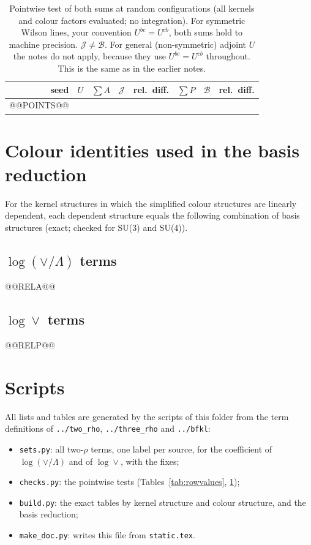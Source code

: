 \documentclass[10pt]{article}
\numberwithin{equation}{section}
\newcommand{\J}{\mathcal J}
\newcommand{\B}{\mathcal B}
\begin{document}
\begin{table}[H]
\centering\small
\begin{tabular}{@{}r l r r c r r c@{}}
seed & $U$ & $\sum A$ & $\J$ & rel.\ diff. & $\sum P$ & $\B$ & rel.\ diff.\\ \hline
@@POINTS@@
\end{tabular}
\caption{Pointwise test of both sums at random configurations (all kernels and colour factors evaluated; no integration). For symmetric Wilson lines, your convention $U^{bc}=U^{cb}$, both sums hold to machine precision. $\J\ne\B$. For general (non-symmetric) adjoint $U$ the notes do not apply, because they use $U^{bc}=U^{cb}$ throughout. This is the same as in the earlier notes.}
\label{tab:points}
\end{table}

\appendix
\section{Colour identities used in the basis reduction}\label{app:rel}
For the kernel structures in which the simplified colour structures are linearly dependent, each dependent structure equals the following combination of basis structures (exact; checked for SU(3) and SU(4)).
\subsection{\texorpdfstring{$\log(\vee/\Lambda)$}{log(vee/Lambda)} terms}
@@RELA@@
\subsection{\texorpdfstring{$\log\vee$}{log vee} terms}
@@RELP@@

\section{Scripts}\label{app:scripts}
All lists and tables are generated by the scripts of this folder from the term definitions of \texttt{../two\_rho}, \texttt{../three\_rho} and \texttt{../bfkl}:
\begin{itemize}
\item \texttt{sets.py}: all two-$\rho$ terms, one label per source, for the coefficient of $\log(\vee/\Lambda)$ and of $\log\vee$, with the fixes;
\item \texttt{checks.py}: the pointwise tests (Tables~\ref{tab:rowvalues}, \ref{tab:points});
\item \texttt{build.py}: the exact tables by kernel structure and colour structure, and the basis reduction;
\item \texttt{make\_doc.py}: writes this file from \texttt{static.tex}.
\end{itemize}
\end{document}
